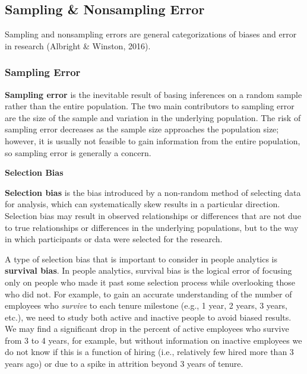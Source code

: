 \documentclass[
]{book}
\begin{document}
\hypertarget{sampling-nonsampling-error}{%
\subsection{Sampling \& Nonsampling Error}\label{sampling-nonsampling-error}}

Sampling and nonsampling errors are general categorizations of biases and error in research (Albright \& Winston, 2016).

\hypertarget{sampling-error}{%
\subsubsection{Sampling Error}\label{sampling-error}}

\textbf{Sampling error} is the inevitable result of basing inferences on a random sample rather than the entire population. The two main contributors to sampling error are the size of the sample and variation in the underlying population. The risk of sampling error decreases as the sample size approaches the population size; however, it is usually not feasible to gain information from the entire population, so sampling error is generally a concern.

\textbf{Selection Bias}

\textbf{Selection bias} is the bias introduced by a non-random method of selecting data for analysis, which can systematically skew results in a particular direction. Selection bias may result in observed relationships or differences that are not due to true relationships or differences in the underlying populations, but to the way in which participants or data were selected for the research.

A type of selection bias that is important to consider in people analytics is \textbf{survival bias}. In people analytics, survival bias is the logical error of focusing only on people who made it past some selection process while overlooking those who did not. For example, to gain an accurate understanding of the number of employees who \emph{survive} to each tenure milestone (e.g., 1 year, 2 years, 3 years, etc.), we need to study both active and inactive people to avoid biased results. We may find a significant drop in the percent of active employees who survive from 3 to 4 years, for example, but without information on inactive employees we do not know if this is a function of hiring (i.e., relatively few hired more than 3 years ago) or due to a spike in attrition beyond 3 years of tenure.
\end{document}
